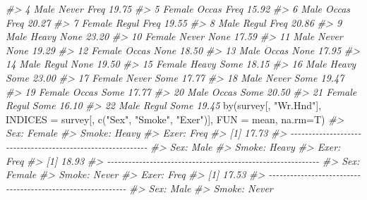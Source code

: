 \documentclass[
]{book}
\newenvironment{Shaded}{\begin{snugshade}}{\end{snugshade}}
\newcommand{\AttributeTok}[1]{\textcolor[rgb]{0.77,0.63,0.00}{#1}}
\newcommand{\CommentTok}[1]{\textcolor[rgb]{0.56,0.35,0.01}{\textit{#1}}}
\newcommand{\FunctionTok}[1]{\textcolor[rgb]{0.00,0.00,0.00}{#1}}
\newcommand{\NormalTok}[1]{#1}
\newcommand{\StringTok}[1]{\textcolor[rgb]{0.31,0.60,0.02}{#1}}
\begin{document}
\begin{Shaded}
\begin{Highlighting}[]
\CommentTok{\#\textgreater{} 4    Male Never Freq 19.75}
\CommentTok{\#\textgreater{} 5  Female Occas Freq 15.92}
\CommentTok{\#\textgreater{} 6    Male Occas Freq 20.27}
\CommentTok{\#\textgreater{} 7  Female Regul Freq 19.55}
\CommentTok{\#\textgreater{} 8    Male Regul Freq 20.86}
\CommentTok{\#\textgreater{} 9    Male Heavy None 23.20}
\CommentTok{\#\textgreater{} 10 Female Never None 17.59}
\CommentTok{\#\textgreater{} 11   Male Never None 19.29}
\CommentTok{\#\textgreater{} 12 Female Occas None 18.50}
\CommentTok{\#\textgreater{} 13   Male Occas None 17.95}
\CommentTok{\#\textgreater{} 14   Male Regul None 19.50}
\CommentTok{\#\textgreater{} 15 Female Heavy Some 18.15}
\CommentTok{\#\textgreater{} 16   Male Heavy Some 23.00}
\CommentTok{\#\textgreater{} 17 Female Never Some 17.77}
\CommentTok{\#\textgreater{} 18   Male Never Some 19.47}
\CommentTok{\#\textgreater{} 19 Female Occas Some 17.77}
\CommentTok{\#\textgreater{} 20   Male Occas Some 20.50}
\CommentTok{\#\textgreater{} 21 Female Regul Some 16.10}
\CommentTok{\#\textgreater{} 22   Male Regul Some 19.45}
\FunctionTok{by}\NormalTok{(survey[, }\StringTok{"Wr.Hnd"}\NormalTok{], }\AttributeTok{INDICES =}\NormalTok{ survey[, }\FunctionTok{c}\NormalTok{(}\StringTok{"Sex"}\NormalTok{, }\StringTok{"Smoke"}\NormalTok{, }\StringTok{"Exer"}\NormalTok{)], }\AttributeTok{FUN =}\NormalTok{ mean, }\AttributeTok{na.rm=}\NormalTok{T)}
\CommentTok{\#\textgreater{} Sex: Female}
\CommentTok{\#\textgreater{} Smoke: Heavy}
\CommentTok{\#\textgreater{} Exer: Freq}
\CommentTok{\#\textgreater{} [1] 17.73}
\CommentTok{\#\textgreater{} {-}{-}{-}{-}{-}{-}{-}{-}{-}{-}{-}{-}{-}{-}{-}{-}{-}{-}{-}{-}{-}{-}{-}{-}{-}{-}{-}{-}{-}{-}{-}{-}{-}{-}{-}{-}{-}{-}{-}{-}{-}{-}{-}{-}{-}{-}{-}{-}{-}{-}{-}{-}{-}{-}{-}{-}{-}{-}{-}{-} }
\CommentTok{\#\textgreater{} Sex: Male}
\CommentTok{\#\textgreater{} Smoke: Heavy}
\CommentTok{\#\textgreater{} Exer: Freq}
\CommentTok{\#\textgreater{} [1] 18.93}
\CommentTok{\#\textgreater{} {-}{-}{-}{-}{-}{-}{-}{-}{-}{-}{-}{-}{-}{-}{-}{-}{-}{-}{-}{-}{-}{-}{-}{-}{-}{-}{-}{-}{-}{-}{-}{-}{-}{-}{-}{-}{-}{-}{-}{-}{-}{-}{-}{-}{-}{-}{-}{-}{-}{-}{-}{-}{-}{-}{-}{-}{-}{-}{-}{-} }
\CommentTok{\#\textgreater{} Sex: Female}
\CommentTok{\#\textgreater{} Smoke: Never}
\CommentTok{\#\textgreater{} Exer: Freq}
\CommentTok{\#\textgreater{} [1] 17.53}
\CommentTok{\#\textgreater{} {-}{-}{-}{-}{-}{-}{-}{-}{-}{-}{-}{-}{-}{-}{-}{-}{-}{-}{-}{-}{-}{-}{-}{-}{-}{-}{-}{-}{-}{-}{-}{-}{-}{-}{-}{-}{-}{-}{-}{-}{-}{-}{-}{-}{-}{-}{-}{-}{-}{-}{-}{-}{-}{-}{-}{-}{-}{-}{-}{-} }
\CommentTok{\#\textgreater{} Sex: Male}
\CommentTok{\#\textgreater{} Smoke: Never}

\end{Highlighting}
\end{Shaded}
\end{document}
